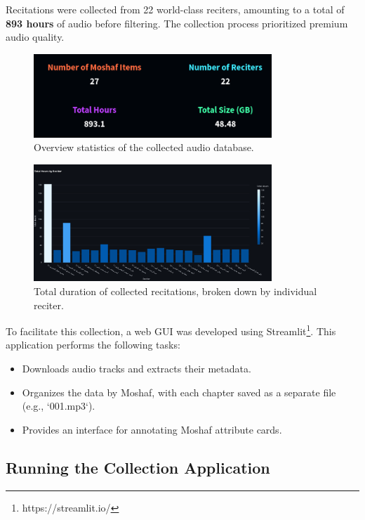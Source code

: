 Recitations were collected from 22 world-class reciters, amounting to a total of \textbf{893 hours} of audio before filtering. The collection process prioritized premium audio quality.

\begin{figure}[H]
\centering
\includegraphics[width=0.8\textwidth]{../figures/stats.png}
\caption{Overview statistics of the collected audio database.}
\label{fig:stats}
\end{figure}

\begin{figure}[H]
\centering
\includegraphics[width=0.8\textwidth]{./figures/reciter.png}
\caption{Total duration of collected recitations, broken down by individual reciter.}
\label{fig:reciter}
\end{figure}

To facilitate this collection, a web GUI was developed using Streamlit\footnote{https://streamlit.io/}. This application performs the following tasks:
\begin{itemize}
\item Downloads audio tracks and extracts their metadata.
\item Organizes the data by Moshaf, with each chapter saved as a separate file (e.g., `001.mp3`).
\item Provides an interface for annotating Moshaf attribute cards.
\end{itemize}

\subsection{Running the Collection Application}

